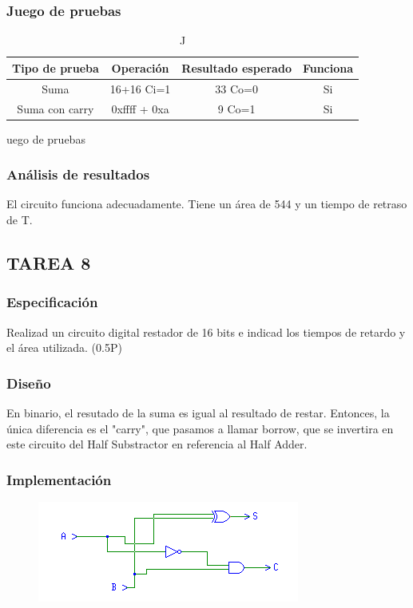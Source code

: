 \documentclass{article}
\begin{document}
		\subsubsection*{Juego de pruebas}
		\begin{table}[h]
			\begin{center}
				\begin{tabular}{| c | c | c | c |}
					\hline
					Tipo de prueba & Operación & Resultado esperado & Funciona \\ \hline
						
					Suma & 16+16 Ci=1 & 33 Co=0 & Si \\ \hline
					Suma con carry & 0xffff + 0xa & 9 Co=1 & Si \\ \hline
	
				\end{tabular}
				\caption Juego de pruebas
			\end{center}
		\end{table}



		\subsubsection*{Análisis de resultados}
		El circuito funciona adecuadamente. Tiene un área de 544 y un tiempo de retraso de T. %

	
	\subsection{TAREA 8}
		\subsubsection*{Especificación}
		Realizad un circuito digital restador de 16 bits e indicad los tiempos de retardo y el área
		utilizada. (0.5P)

		\subsubsection*{Diseño}
		En binario, el resutado de la suma es igual al resultado de restar. Entonces, la única diferencia es el "carry", que pasamos a llamar borrow, que se invertira en este circuito del Half Substractor en referencia al Half Adder.


		\subsubsection*{Implementación}
		 \begin{figure}[ht]
			\includegraphics[width=0.8\linewidth]{HS}
			\centering
		 \end{figure}
\end{document}
